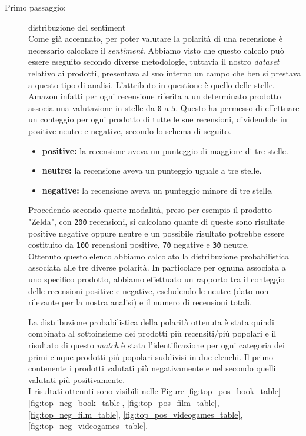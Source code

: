 		\begin{description}
		\item [Primo passaggio:] distribuzione del sentiment\\
			Come già accennato, per poter valutare la polarità di una recensione è necessario calcolare il \textit{sentiment}. Abbiamo visto che questo calcolo può essere eseguito secondo diverse metodologie, tuttavia il nostro \textit{dataset} relativo ai prodotti, presentava al suo interno un campo che ben si prestava a questo tipo di analisi. L'attributo in questione è quello delle stelle. Amazon infatti per ogni recensione riferita a un determinato prodotto associa una valutazione in stelle da \verb|0| a \verb|5|. Questo ha permesso di effettuare un conteggio per ogni prodotto di tutte le sue recensioni, dividendole in positive neutre e negative, secondo lo schema di seguito.
			
			\begin{itemize}
				\item \textbf{positive:} la recensione aveva un punteggio di maggiore di tre stelle.
				\item \textbf{neutre:} la recensione aveva un punteggio uguale a tre stelle.
				\item \textbf{negative:} la recensione aveva un punteggio minore di tre stelle.
			\end{itemize}
			
			Procedendo secondo queste modalità, preso per esempio il prodotto "Zelda", con \verb|200| recensioni, si calcolano quante di queste sono risultate positive negative oppure neutre e un possibile risultato potrebbe essere costituito da \verb|100| recensioni positive, \verb|70| negative e \verb|30| neutre. \\		
			Ottenuto questo elenco abbiamo calcolato la distribuzione probabilistica associata alle tre diverse polarità. In particolare per ognuna associata a uno specifico prodotto, abbiamo effettuato un rapporto tra il conteggio delle recensioni positive e negative, escludendo le neutre (dato non rilevante per la nostra analisi) e il numero di recensioni totali. 
			
			La distribuzione probabilistica della polarità ottenuta è stata quindi combinata al sottoinsieme dei prodotti più recensiti/più popolari e il risultato di questo \textit{match} è stata l'identificazione per ogni categoria dei primi cinque prodotti più popolari suddivisi in due elenchi. Il primo contenente i prodotti valutati più negativamente e nel secondo quelli valutati più positivamente. \\
			I risultati ottenuti sono visibili nelle Figure \ref{fig:top_pos_book_table} \ref{fig:top_neg_book_table}, \ref{fig:top_pos_film_table}, \ref{fig:top_neg_film_table}, \ref{fig:top_pos_videogames_table}, \ref{fig:top_neg_videogames_table}.
			

\end{description}
